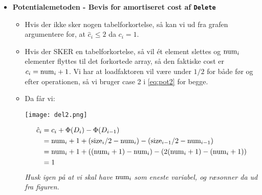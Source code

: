 \begin{itemize}
\item \textbf{Potentialemetoden - Bevis for amortiseret cost af \texttt{Delete}}
\begin{itemize}
	\item Hvis der ikke sker nogen tabelforkortelse, så kan vi ud fra grafen argumentere for, at $\hat c_i \leq 2$ da $c_i = 1$.
	\item Hvis der SKER en tabelforkortelse, så vil ét element slettes og ${\textrm{num} }_i$ elementer flyttes til det forkortede array, så den faktiske cost er $c_i = {\textrm{num} }_i + 1$. Vi har at loadfaktoren vil være under $1/2$ for både før og efter operationen, så vi bruger case 2 i \cref{eq:pot2} for begge.
	\item Da får vi:
	\begin{center}
		\texttt{[image: del2.png]}
	\end{center}
	\begin{align*}
	\hat c_i &= c_i + \Phi(D_i) - \Phi(D_{i-1})\\
	         &= {\textrm{num} }_i + 1 + \left(  {\textrm{size} }_i / 2 - {\textrm{num} }_i  \right) - \left(  {\textrm{size} }_{i-1} / 2 - {\textrm{num} }_{i-1}  \right)\\
	         &= {\textrm{num} }_i + 1 + \left(  ({\textrm{num} }_i + 1) - {\textrm{num} }_i  \right) - \left(  2({\textrm{num} }_i + 1) - ({\textrm{num} }_i + 1)  \right)\\
	         &= 1
	\end{align*}
	\textit{Husk igen på at vi skal have} ${\textrm{num} }_i$ \textit{som eneste variabel, og ræsonner da ud fra figuren.}
\end{itemize}


\end{itemize}

